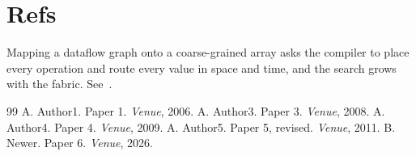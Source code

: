 \documentclass{article}
\begin{document}
\section{Refs}
Mapping a dataflow graph onto a coarse-grained array asks the compiler to place every operation and route every value in space and time, and the search grows with the fabric. See~\cite{k01,k03,k06}.

\begin{thebibliography}{99}
 A. Author1. Paper 1. \emph{Venue}, 2006.
 A. Author3. Paper 3. \emph{Venue}, 2008.
 A. Author4. Paper 4. \emph{Venue}, 2009.
 A. Author5. Paper 5, revised. \emph{Venue}, 2011.
 B. Newer. Paper 6. \emph{Venue}, 2026.
\end{thebibliography}
\end{document}
